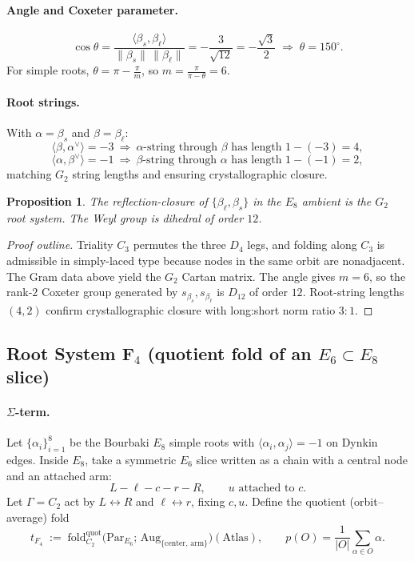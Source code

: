 \documentclass[12pt]{article}
\newtheorem{proposition}[theorem]{Proposition}
\begin{document}
\paragraph{Angle and Coxeter parameter.}
\[
\cos\theta=\frac{\langle\beta_s,\beta_\ell\rangle}{\|\beta_s\|\,\|\beta_\ell\|}=-\frac{3}{\sqrt{12}}=-\frac{\sqrt{3}}{2}\;\Rightarrow\; \theta=150^\circ.
\]
For simple roots, $\theta=\pi-\frac{\pi}{m}$, so $m=\frac{\pi}{\pi-\theta}=6$.

\paragraph{Root strings.}
With $\alpha=\beta_s$ and $\beta=\beta_\ell$:
\[
\langle\beta,\alpha^\vee\rangle=-3\ \Rightarrow\ \text{$\alpha$-string through $\beta$ has length }1-(-3)=4,
\]
\[
\langle\alpha,\beta^\vee\rangle=-1\ \Rightarrow\ \text{$\beta$-string through $\alpha$ has length }1-(-1)=2,
\]
matching $G_2$ string lengths and ensuring crystallographic closure.

\begin{proposition}
The reflection-closure of $\{\beta_\ell,\beta_s\}$ in the $E_8$ ambient is the $G_2$ root system. The Weyl group is dihedral of order $12$.
\end{proposition}

\begin{proof}[Proof outline]
Triality $C_3$ permutes the three $D_4$ legs, and folding along $C_3$ is admissible in simply-laced type because nodes in the same orbit are nonadjacent. The Gram data above yield the $G_2$ Cartan matrix. The angle gives $m=6$, so the rank-$2$ Coxeter group generated by $s_{\beta_s},s_{\beta_\ell}$ is $D_{12}$ of order $12$. Root-string lengths $(4,2)$ confirm crystallographic closure with long:short norm ratio $3:1$. \qedhere
\end{proof}

\subsection{Root System F$_4$ (quotient fold of an $E_6\subset E_8$ slice)}\label{sec:f4-fold}

\paragraph{$\Sigma$-term.}
Let $\{\alpha_i\}_{i=1}^8$ be the Bourbaki $E_8$ simple roots with $\langle\alpha_i,\alpha_j\rangle=-1$ on Dynkin edges. Inside $E_8$, take a symmetric $E_6$ slice written as a chain with a central node and an attached arm:
\[
L-\ell-\boxed{c}-r-R,\qquad u\text{ attached to }c .
\]
Let $\Gamma=C_2$ act by $L\leftrightarrow R$ and $\ell\leftrightarrow r$, fixing $c,u$. Define the quotient (orbit–average) fold
\[
t_{F_4}\;:=\;\mathrm{fold}^{\mathrm{quot}}_{C_2}\!\big(\mathrm{Par}_{E_6};\,\mathrm{Aug}_{\{\text{center, arm}\}}\big)(\text{Atlas}),
\qquad
p(O)=\frac{1}{|O|}\sum_{\alpha\in O}\alpha .
\]
\end{document}
